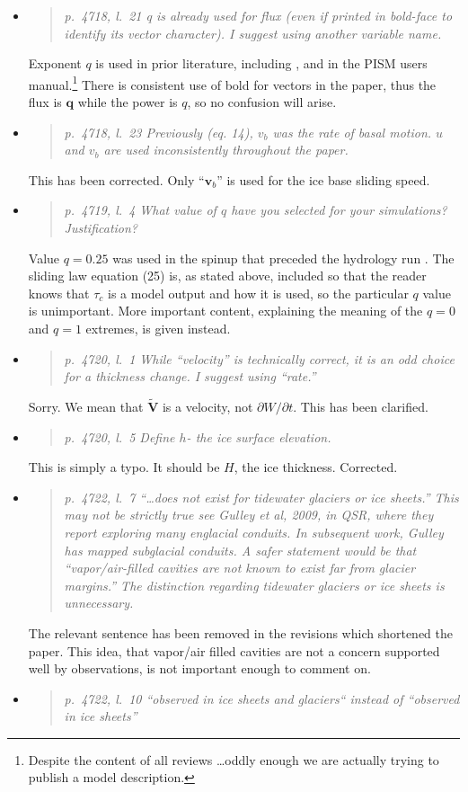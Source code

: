 \documentclass[11pt,reqno]{amsart}
\newcommand{\reply}[2]{
\medskip\medskip
\item  \begin{quote}
\emph{#1}
\end{quote}

\medskip
\noindent #2}
\begin{document}
\begin{itemize}
\reply{p.~4718, l.~21 q is already used for flux (even if printed in bold-face to identify its vector character).  I suggest using another variable name.}
{Exponent $q$ is used in prior literature, including \cite{AschwandenAdalgeirsdottirKhroulev}, and in the PISM users manual.\footnote{Despite the content of all reviews \dots oddly enough we are actually trying to publish a model description.}  There is consistent use of bold for vectors in the paper, thus the flux is $\mathbf{q}$ while the power is $q$, so no confusion will arise.}

\reply{p.~4718, l.~23 Previously (eq. 14), $v_b$ was the rate of basal motion. $u$ and $v_b$ are used inconsistently throughout the paper.}
{This has been corrected.  Only ``$\mathbf{v}_b$'' is used for the ice base sliding speed.}

\reply{p.~4719, l.~4 What value of $q$ have you selected for your simulations? Justification?}
{Value $q=0.25$ was used in the spinup that preceded the hydrology run \cite{AschwandenAdalgeirsdottirKhroulev}.  The sliding law equation (25) is, as stated above, included so that the reader knows that $\tau_c$ is a model output and how it is used, so the particular $q$ value is unimportant.  More important content, explaining the meaning of the $q=0$ and $q=1$ extremes, is given instead.}

\reply{p.~4720, l.~1  While ``velocity'' is technically correct, it is an odd choice for a thickness change. I suggest using ``rate.''}
{Sorry.  We mean that $\tilde{\mathbf{V}}$ is a velocity, not $\partial W/\partial t$.  This has been clarified.}

\reply{p.~4720, l.~5 Define $h$- the ice surface elevation.}
{This is simply a typo.  It should be $H$, the ice thickness.  Corrected.}

\reply{p.~4722, l.~7 ``\dots does not exist for tidewater glaciers or ice sheets.'' This may not be strictly true see Gulley et al, 2009, in QSR, where they report exploring many englacial conduits.  In subsequent work, Gulley has mapped subglacial conduits.  A safer statement would be that ``vapor/air-filled cavities are not known to exist far from glacier margins.''  The distinction regarding tidewater glaciers or ice sheets is unnecessary.}
{The relevant sentence has been removed in the revisions which shortened the paper.  This idea, that vapor/air filled cavities are not a concern supported well by observations, is not important enough to comment on.}

\reply{p.~4722, l.~10 ``observed in ice sheets and glaciers`` instead of ``observed in ice sheets''}
{}


\end{itemize}
\end{document}
